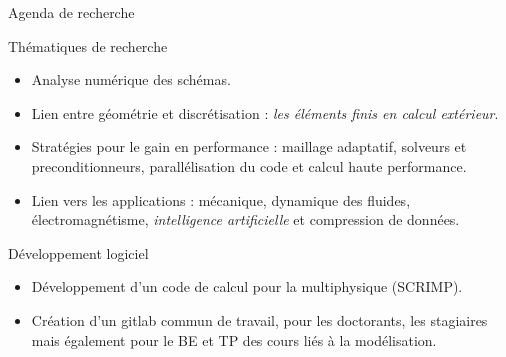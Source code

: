 \documentclass[aspectratio=169, french]{beamer}
\begin{document}
\begin{frame}{Agenda de recherche}
	
	\begin{block}{Thématiques de recherche}
		\begin{itemize}
			\item Analyse numérique des schémas.
			\item Lien entre géométrie et discrétisation : \textit{les éléments finis en calcul extérieur}.
			\item Stratégies pour le gain en performance : maillage adaptatif, solveurs et preconditionneurs, parallélisation du code et calcul haute performance. 
			\item Lien vers les applications : mécanique, dynamique des fluides, électromagnétisme, \textit{intelligence artificielle} et compression de données.
		\end{itemize}

		
	\end{block}
	
	
	\begin{block}{Développement logiciel}
		\begin{itemize}
			\item Développement d'un code de calcul pour la multiphysique (SCRIMP).
			\item Création d'un gitlab commun de travail, pour les doctorants, les stagiaires mais également pour le BE et TP des cours liés à la modélisation.
		\end{itemize}	
		
	\end{block}
	
\end{frame}
\end{document}
